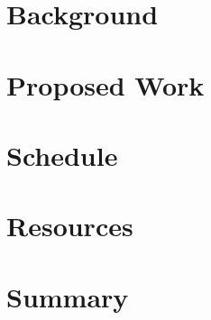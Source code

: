 \documentclass[letterpaper,10 pt,conference,onecolumn]{IEEEtran}
\begin{document}
	\section{Background}
	
	\section{Proposed Work}

	\section{Schedule}
	
	\section{Resources}
	
	\section{Summary}
 
	
	
	
	
	
\end{document}
